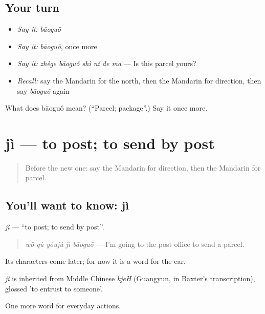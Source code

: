 \subsection*{Your turn}
\begin{itemize}
\raggedright
  \item \emph{Say it:} \emph{bāoguǒ}
  \item \emph{Say it:} \emph{bāoguǒ}, once more
  \item \emph{Say it:} \emph{zhège bāoguǒ shì nǐ de ma} — Is this parcel yours?
  \item \emph{Recall:} say the Mandarin for the north, then the Mandarin for direction, then say \emph{bāoguǒ} again
\end{itemize}

\begin{tcolorbox}[breakable,colback=teal!4,colframe=teal!35!black,title={Before you move on}]
What does bāoguǒ mean? (\textquotedblleft{}Parcel; package\textquotedblright{}.) Say it once more.
\end{tcolorbox}
\section[jì]{jì — to post; to send by post}

\label{lesson:ZH-C118-ji}



\begin{quote}
Before the new one: say the Mandarin for direction, then the Mandarin for parcel.
\end{quote}

\subsection*{You'll want to know: jì}
\emph{jì} — \textquotedblleft{}to post; to send by post\textquotedblright{}.

\begin{quote}
\emph{wǒ qù yóujú jì bāoguǒ} — I'm going to the post office to send a parcel.
\end{quote}

Its characters come later; for now it is a word for the ear.

\begin{cousinweb}
\emph{jì} is inherited from Middle Chinese \emph{kjeH} (Guangyun, in Baxter's transcription), glossed 'to entrust to someone'.
\end{cousinweb}

\begin{grammarlens}[title={What you've built}]
One more word for everyday actions.
\end{grammarlens}

